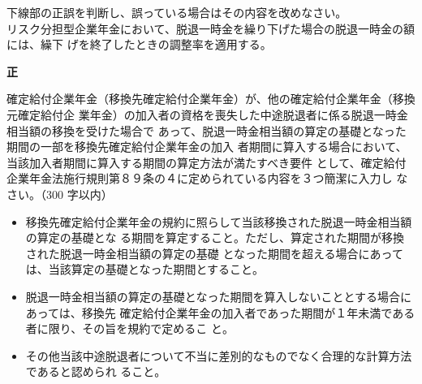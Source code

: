 \begin{truefalse}[年金1 H29 問題1(5)\textcircled{5}]
    下線部の正誤を判断し、誤っている場合はその内容を改めなさい。
  \\

  リスク分担型企業年金において、脱退一時金を繰り下げた場合の脱退一時金の額には、繰下
げを終了したときの調整率を適用する。
\end{truefalse}

\begin{answerbox}
  \textbf{正}
\end{answerbox}

\begin{shortanswer}
  確定給付企業年金（移換先確定給付企業年金）が、他の確定給付企業年金（移換元確定給付企
業年金）の加入者の資格を喪失した中途脱退者に係る脱退一時金相当額の移換を受けた場合で
あって、脱退一時金相当額の算定の基礎となった期間の一部を移換先確定給付企業年金の加入
者期間に算入する場合において、当該加入者期間に算入する期間の算定方法が満たすべき要件
として、確定給付企業年金法施行規則第８９条の４に定められている内容を３つ簡潔に入力し
なさい。（300 字以内）
\end{shortanswer}

\begin{answerbox}
  \begin{itemize}
    \item 移換先確定給付企業年金の規約に照らして当該移換された脱退一時金相当額の算定の基礎とな
る期間を算定すること。ただし、算定された期間が移換された脱退一時金相当額の算定の基礎
となった期間を超える場合にあっては、当該算定の基礎となった期間とすること。
    \item 脱退一時金相当額の算定の基礎となった期間を算入しないこととする場合にあっては、移換先
確定給付企業年金の加入者であった期間が１年未満である者に限り、その旨を規約で定めるこ
と。
    \item その他当該中途脱退者について不当に差別的なものでなく合理的な計算方法であると認められ
ること。
  \end{itemize}
\end{answerbox}

\newpage
